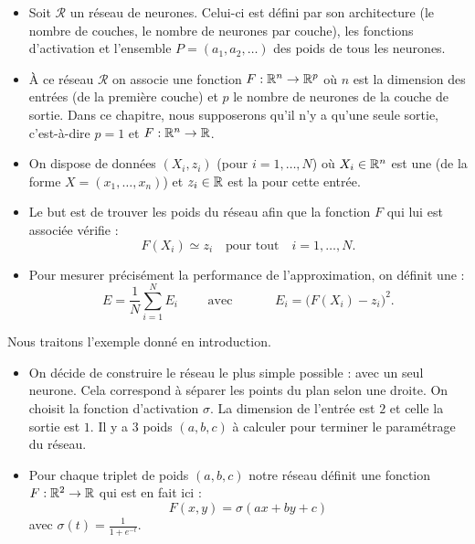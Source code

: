 {\begin{itemize}
	\item Soit $\mathcal{R}$ un réseau de neurones. Celui-ci est défini par son architecture (le nombre de couches, le nombre de neurones par couche), les fonctions d'activation et l'ensemble $P = (a_1,a_2,\ldots)$ des poids de tous les neurones.
	
	\item \`A ce réseau $\mathcal{R}$ on associe une fonction $F : \mathbb{R}^n \to \mathbb{R}^p$ où $n$ est la dimension des entrées (de la première couche) et $p$ le nombre de neurones de la couche de sortie.
	Dans ce chapitre, nous supposerons qu'il n'y a qu'une seule sortie, c'est-à-dire $p=1$ et $F : \mathbb{R}^n \to \mathbb{R}$.
	
	
	
	\item On dispose de données $(X_i,z_i)$ (pour $i=1,\ldots,N$) où $X_i \in \mathbb{R}^n$ est une  (de la forme $X=(x_1,\ldots,x_n)$) et $z_i \in \mathbb{R}$ est la  pour cette entrée.
	
	\item Le but est de trouver les poids du réseau afin que la fonction $F$ qui lui est associée vérifie :
	$$F(X_i) \simeq z_i \quad \text{pour tout} \quad i=1,\ldots,N.$$ 
	
	\item Pour mesurer précisément la performance de l'approximation, on définit une  :
	$$E = \frac{1}N \sum_{i=1}^N E_i \qquad \text{ avec } \qquad \quad E_i = \big( F(X_i) - z_i \big)^2.$$
\end{itemize}


\begin{exemple}{}{}
	Nous traitons l'exemple donné en introduction.
	\begin{itemize}
		\item On décide de construire le réseau le plus simple possible : avec un seul neurone. Cela correspond à séparer les points du plan selon une droite.
		On choisit la fonction d'activation $\sigma$.
		La dimension de l'entrée est $2$ et celle la sortie est $1$.
		Il y a $3$ poids $(a,b,c)$ à calculer pour terminer le paramétrage du réseau.
		
		
		\item Pour chaque triplet de poids $(a,b,c)$ notre réseau définit une fonction $F : \mathbb{R}^2 \to \mathbb{R}$
		qui est en fait ici :
		$$F(x,y) = \sigma(ax+by+c)$$
		avec $\sigma(t) = \frac{1}{1+e^{-t}}$.
		

\end{itemize}
\end{exemple}}
